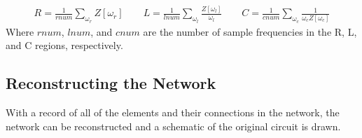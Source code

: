 \begin{align*}
R=\frac{1}{rnum}\sum_{\omega_r}{Z[\omega_r]} \qquad
L=\frac{1}{lnum}\sum_{\omega_l}{\frac{Z[\omega_l]}{\omega_l} \qquad}
C=\frac{1}{cnum}\sum_{\omega_c}{\frac{1}{\omega_c Z[\omega_c]}}
\end{align*}
Where $rnum$, $lnum$, and $cnum$ are the number of sample frequencies in the R, L, and C regions, respectively.

\subsection{Reconstructing the Network}
With a record of all of the elements and their connections in the network, the network can be reconstructed and a schematic of the original circuit is drawn.

%